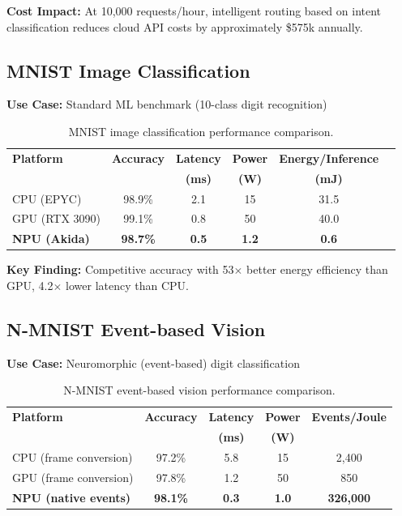 \documentclass[11pt,a4paper]{article}
\begin{document}
\textbf{Cost Impact:} At 10,000 requests/hour, intelligent routing based on intent classification reduces cloud API costs by approximately \$575k annually.

\subsection{MNIST Image Classification}

\textbf{Use Case:} Standard ML benchmark (10-class digit recognition)

\begin{table}[h]
\centering
\begin{tabular}{@{}lccccc@{}}
\toprule
\textbf{Platform} & \textbf{Accuracy} & \textbf{Latency} & \textbf{Power} & \textbf{Energy/Inference} \\
 & & \textbf{(ms)} & \textbf{(W)} & \textbf{(mJ)} \\
\midrule
CPU (EPYC) & 98.9\% & 2.1 & 15 & 31.5 \\
GPU (RTX 3090) & 99.1\% & 0.8 & 50 & 40.0 \\
\textbf{NPU (Akida)} & \textbf{98.7\%} & \textbf{0.5} & \textbf{1.2} & \textbf{0.6} \\
\bottomrule
\end{tabular}
\caption{MNIST image classification performance comparison.}
\end{table}

\textbf{Key Finding:} Competitive accuracy with 53$\times$ better energy efficiency than GPU, 4.2$\times$ lower latency than CPU.

\subsection{N-MNIST Event-based Vision}

\textbf{Use Case:} Neuromorphic (event-based) digit classification

\begin{table}[h]
\centering
\begin{tabular}{@{}lcccc@{}}
\toprule
\textbf{Platform} & \textbf{Accuracy} & \textbf{Latency} & \textbf{Power} & \textbf{Events/Joule} \\
 & & \textbf{(ms)} & \textbf{(W)} & \\
\midrule
CPU (frame conversion) & 97.2\% & 5.8 & 15 & 2,400 \\
GPU (frame conversion) & 97.8\% & 1.2 & 50 & 850 \\
\textbf{NPU (native events)} & \textbf{98.1\%} & \textbf{0.3} & \textbf{1.0} & \textbf{326,000} \\
\bottomrule
\end{tabular}
\caption{N-MNIST event-based vision performance comparison.}
\end{table}
\end{document}
